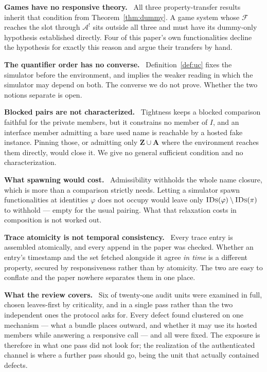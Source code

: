 \documentclass[10pt,oneside,openany]{book}
\newcommand{\Apid}{\mathbf{A}}
\newcommand{\Zpid}{\mathbf{Z}}
\newcommand{\F}{\mathcal{F}}
\newcommand{\Adv}{\mathcal{A}}
\newcommand{\op}[1]{\textnormal{\textsc{#1}}}
\newcommand{\IDs}{\op{IDs}}
\newcommand{\heading}[1]{\medskip\par\noindent\textcolor{accent}{\textbf{#1.}}\ }
\theoremstyle{accentdef}
\theoremstyle{accentplain}
\begin{document}
\heading{Games have no responsive theory} All three property-transfer results inherit that
condition from Theorem~\ref{thm:dummy}. A game system whose $\F$ reaches the slot through
$\Adv^{!}$ sits outside all three and must have its dummy-only hypothesis established directly.
Four of this paper's own functionalities decline the hypothesis for exactly this reason and argue
their transfers by hand.

\heading{The quantifier order has no converse} Definition~\ref{def:uc} fixes the simulator before
the environment, and implies the weaker reading in which the simulator may depend on both. The
converse we do not prove. Whether the two notions separate is open.

\heading{Blocked pairs are not characterized} Tightness keeps a blocked comparison faithful for the
private members, but it constrains no member of $I$, and an interface member admitting a bare used
name is reachable by a hosted fake instance. Pinning those, or admitting only
$\Zpid \cup \Apid$ where the environment reaches them directly, would close it. We give no general
sufficient condition and no characterization.

\heading{What spawning would cost} Admissibility withholds the whole name closure, which is more
than a comparison strictly needs. Letting a simulator spawn functionalities at identities $\varphi$
does not occupy would leave only $\IDs(\varphi) \setminus \IDs(\pi)$ to withhold --- empty for the
usual pairing. What that relaxation costs in composition is not worked out.

\heading{Trace atomicity is not temporal consistency} Every trace entry is assembled atomically,
and every append in the paper was checked. Whether an entry's timestamp and the set fetched
alongside it agree \emph{in time} is a different property, secured by responsiveness rather than by
atomicity. The two are easy to conflate and the paper nowhere separates them in one place.

\heading{What the review covers} Six of twenty-one audit units were examined in full, chosen
leaves-first by criticality, and in a single pass rather than the two independent ones the protocol
asks for. Every defect found clustered on one mechanism --- what a bundle places outward, and
whether it may use its hosted members while answering a responsive call --- and all were fixed.
The exposure is therefore in what one pass did not look for; the realization of the authenticated
channel is where a further pass should go, being the unit that actually contained defects.
\end{document}
